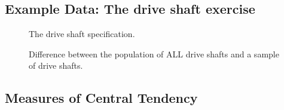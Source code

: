 \documentclass[
  a4paper,
]{scrbook}
\begin{document}
\subsection{Example Data: The drive shaft
exercise}\label{example-data-the-drive-shaft-exercise}

\begin{figure}[ht]


\caption{\label{fig-drive-shaft-intro}The drive shaft specification.}

\end{figure}%

\begin{figure}[ht]


\caption{\label{fig-drive-shaft-pop-smpl}Difference between the
population of ALL drive shafts and a sample of drive shafts.}

\end{figure}%

\subsection{Measures of Central
Tendency}\label{measures-of-central-tendency}
\end{document}
